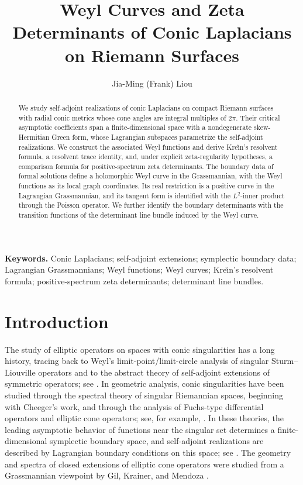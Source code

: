 \documentclass[12pt]{amsart}
\title[Weyl Curves and Zeta Determinants]
{Weyl Curves and Zeta Determinants of Conic Laplacians
on Riemann Surfaces}
\theoremstyle{plain}
\theoremstyle{definition}
\theoremstyle{remark}
\numberwithin{equation}{section} \numberwithin{figure}{section}
\begin{document}
\author{Jia-Ming (Frank) Liou}
\address{Department of Mathematics\\
National Cheng Kung University\\
No.1, University Road, Tainan City 701, Taiwan\\ fjmliou@mail.ncku.edu.tw}





\begin{abstract}
We study self-adjoint realizations of conic Laplacians on compact
Riemann surfaces with radial conic metrics whose cone angles are
integral multiples of \(2\pi\). Their critical asymptotic coefficients
span a finite-dimensional space with a nondegenerate skew-Hermitian
Green form, whose Lagrangian subspaces parametrize the self-adjoint
realizations. We
construct the associated Weyl functions and derive Kre\u{\i}n's
resolvent formula, a resolvent trace identity, and, under explicit
zeta-regularity hypotheses, a comparison formula for
positive-spectrum zeta determinants. The boundary data of formal
solutions define a holomorphic Weyl curve in the Grassmannian, with
the Weyl functions as its local graph coordinates. Its real
restriction is a positive curve in the Lagrangian Grassmannian, and
its tangent form is identified with the \(L^2\)-inner product through
the Poisson operator. We further identify
the boundary determinants with the transition functions of the
determinant line bundle induced by the Weyl curve.
\end{abstract}  


\maketitle


\noindent\textbf{Keywords.}
Conic Laplacians; self-adjoint extensions; symplectic boundary data;
Lagrangian Grassmannians; Weyl functions; Weyl curves; Kre\u{\i}n's
resolvent formula; positive-spectrum zeta determinants; determinant
line bundles.
\section{Introduction}

The study of elliptic operators on spaces with conic singularities
has a long history, tracing back to Weyl's limit-point/limit-circle
analysis of singular Sturm--Liouville operators and to the abstract
theory of self-adjoint extensions of symmetric operators; see
\cite{WH,vnj}. In geometric analysis, conic singularities have been
studied through the spectral theory of singular Riemannian spaces,
beginning with Cheeger's work, and through the analysis of Fuchs-type
differential operators and elliptic cone operators; see, for example,
\cite{cj,cj2,SBW,lm}. In these theories, the leading asymptotic
behavior of functions near the singular set determines a
finite-dimensional symplectic boundary space, and self-adjoint
realizations are described by Lagrangian boundary conditions on this
space; see \cite{gjb}. The geometry and spectra of closed extensions
of elliptic cone operators were studied from a Grassmannian viewpoint
by Gil, Krainer, and Mendoza \cite{GilKrainerMendoza2007}.
\end{document}
